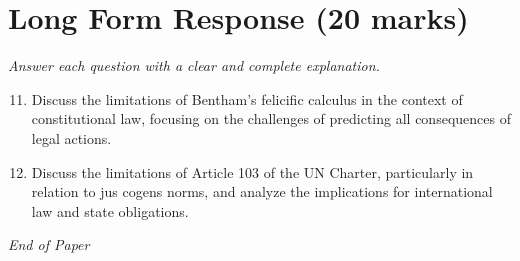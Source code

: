 \documentclass[12pt]{article}
\begin{document}
\section*{Long Form Response (20 marks)}
\textit{Answer each question with a clear and complete explanation.}
\begin{enumerate}[label=\arabic*.]
\setcounter{enumi}{10}
\item Discuss the limitations of Bentham's felicific calculus in the context of constitutional law, focusing on the challenges of predicting all consequences of legal actions.
\item Discuss the limitations of Article 103 of the UN Charter, particularly in relation to jus cogens norms, and analyze the implications for international law and state obligations.
\end{enumerate}

\vfill
\noindent\textit{End of Paper}
\end{document}
